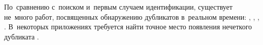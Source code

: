 По~сравнению с~поиском и~первым случаем идентификации,
существует не~много работ, посвященных обнаружению дубликатов
в~реальном времени: \cite{Xie:2010}, \cite{Huang:2009},
\cite{Shen:2007}, \cite{Yan:2008}. В~некоторых приложениях требуется найти
точное место появления нечеткого дубликата \cite{Liu:2013}.

